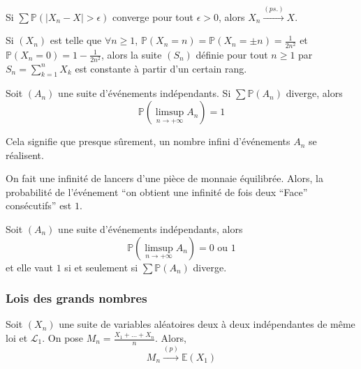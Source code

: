 	\begin{corollary}
		Si $\sum \mathbb{P}(\vert X_n - X \vert > \epsilon)$ converge pour tout $\epsilon > 0$, alors $X_n \overset{(ps.)}{\longrightarrow} X$.
	\end{corollary}
	
	
	\begin{example}
		Si $(X_n)$ est telle que $\forall n \geq 1$, $\mathbb{P}(X_n = n) = \mathbb{P}(X_n = \pm n) = \frac{1}{2n^2}$ et $\mathbb{P}(X_n = 0) = 1 - \frac{1}{2n^2}$, alors la suite $(S_n)$ définie pour tout $n \geq 1$ par $S_n = \sum_{k=1}^n X_k$ est constante à partir d'un certain rang.
	\end{example}
	
	
	\begin{theorem}
		Soit $(A_n)$ une suite d'événements indépendants. Si $\sum \mathbb{P}(A_n)$ diverge, alors
		\[ \mathbb{P} \left( \limsup_{n \rightarrow +\infty} A_n \right) = 1 \]
	\end{theorem}
	
	\begin{remark}
		Cela signifie que presque sûrement, un nombre infini d'événements $A_n$ se réalisent.
	\end{remark}
	
	
	\begin{example}
		On fait une infinité de lancers d'une pièce de monnaie équilibrée. Alors, la probabilité de l'événement ``on obtient une infinité de fois deux ``Face'' consécutifs'' est $1$.
	\end{example}
	
	\begin{corollary}
		Soit $(A_n)$ une suite d'événements indépendants, alors
		\[ \mathbb{P} \left( \limsup_{n \rightarrow +\infty} A_n \right) = 0 \text{ ou } 1 \]
		et elle vaut $1$ si et seulement si $\sum \mathbb{P}(A_n)$ diverge.
	\end{corollary}
	
	\subsubsection{Lois des grands nombres}
	
	
	\begin{theorem}
		Soit $(X_n)$ une suite de variables aléatoires deux à deux indépendantes de même loi et $\mathcal{L}_1$. On pose $M_n = \frac{X_1 + \dots + X_n}{n}$. Alors,
		\[ M_n \overset{(p)}{\longrightarrow} \mathbb{E}(X_1) \]
	\end{theorem}
	
